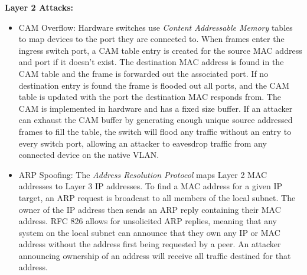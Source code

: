 \textbf{Layer 2 Attacks:} 
\begin{itemize}
\item CAM Overflow: Hardware switches use \textit{Content Addressable Memory} tables to map devices to the port they are connected to. When frames enter the ingress switch port, a CAM table entry is created for the source MAC address and port if it doesn't exist. The destination MAC address is found in the CAM table and the frame is forwarded out the associated port. If no destination entry is found the frame is flooded out all ports, and the CAM table is updated with the port the destination MAC responds from. The CAM is implemented in hardware and has a fixed size buffer. If an attacker can exhaust the CAM buffer by generating enough unique source addressed frames to fill the table, the switch will flood any traffic without an entry to every switch port, allowing an attacker to eavesdrop traffic from any connected device on the native VLAN. 
\item  ARP Spoofing: The \textit{Address Resolution Protocol}\cite{Plummer} maps Layer 2 MAC addresses to Layer 3 IP addresses. To find a MAC address for a given IP target, an ARP request is broadcast to all members of the local subnet. The owner of the IP address then sends an ARP reply containing their MAC address. RFC 826 allows for unsolicited ARP replies, meaning that any system on the local subnet can announce that they own any IP or MAC address without the address first being requested by a peer. An attacker announcing ownership of an address will receive all traffic destined for that address. 

\end{itemize}
